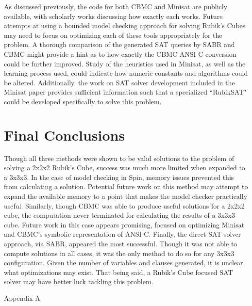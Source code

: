 \documentclass{article}
\begin{document}
\noindent As discussed previously, the code for both CBMC and Minisat are publicly available, with scholarly works discussing how exactly each works. Future attempts at using a bounded model checking approach for solving Rubik's Cubes may need to focus on optimizing each of these tools appropriately for the problem. A thorough comparison of the generated SAT queries by SABR and CBMC might provide a hint as to how exactly the CBMC ANSI-C conversion could be further improved. Study of the heuristics used in Minisat, as well as the learning process used, could indicate how numeric constants and algorithms could be altered. Additionally, the work on SAT solver development included in the Minisat paper provides 
sufficient information such that a specialized ``RubikSAT" could be developed specifically to solve this problem.

\section{Final Conclusions}
Though all three methods were shown to be valid solutions to the problem of solving a 2x2x2 Rubik's Cube, success was much more limited when expanded to a 3x3x3. In the case of model checking in Spin, memory issues prevented this from calculating a solution. Potential future work on this method may attempt to expand the available memory to a point that makes the model checker practically useful. Similarly, though CBMC was able to produce useful solutions for a 2x2x2 cube, the computation never terminated for calculating the results of a 3x3x3 cube. Future work in this case appears promising, focused on optimizing Minisat and CBMC's symbolic representation of ANSI-C. Finally, the direct SAT solver approach, via SABR, appeared the most successful. Though it was not able to compute solutions in all cases, it was the only method to do so for any 3x3x3 configuration. Given the number of variables and clauses generated, it is unclear what optimizations may exist. That being said, a Rubik's Cube focused SAT solver may have better luck tackling this problem.

\pagebreak
\begin{center}
Appendix A
\end{center}
\end{document}
